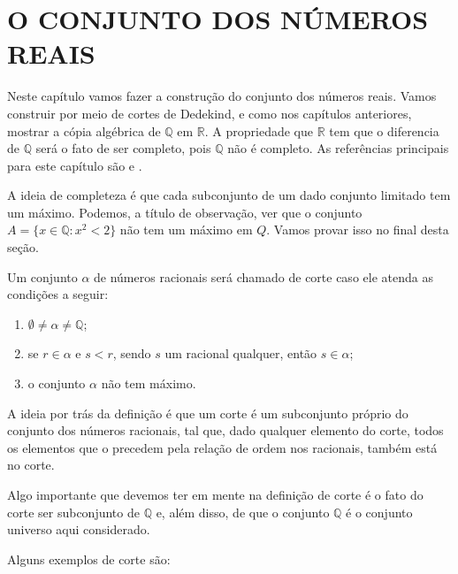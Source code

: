 \documentclass[../main.tex]{subfiles}
\begin{document}
\chapter{O CONJUNTO DOS NÚMEROS REAIS}\label{cap-reais}

Neste capítulo vamos fazer a construção do conjunto dos números reais. Vamos construir por meio de cortes de Dedekind, e como nos capítulos anteriores, mostrar a cópia algébrica de $\mathbb{Q}$ em $\mathbb{R}$. A propriedade que $\mathbb{R}$ tem que o diferencia de $\mathbb{Q}$ será o fato de ser completo, pois $\mathbb{Q}$ não é completo. As referências principais para este capítulo são \textcite{ferreira} e \textcite{domingues-2009}.

A ideia de completeza é que cada subconjunto de um dado conjunto limitado tem um máximo. Podemos, a título de observação, ver que o conjunto 
$A = \{ x \in \mathbb{Q} : x^2 < 2\}$ não tem um máximo em $Q$. Vamos provar isso no final desta seção.

\begin{defi}\label{reais-def-corte}
    Um conjunto $\alpha$ de números racionais será chamado de corte caso ele atenda as condições a seguir:
    \begin{enumerate}[label=(\roman*)]
        \item\label{reais-def-corteSubconjuntoProprio} $\emptyset \neq \alpha \neq \mathbb{Q}$;
        \item\label{reais-def-cortePrecede} se $r \in \alpha$ e $s < r$, sendo $s$ um racional qualquer, então $s \in \alpha$;
        \item\label{reais-def-corteSemMaximo} o conjunto $\alpha$ não tem máximo.
    \end{enumerate}
\end{defi}

A ideia por trás da definição é que um corte é um subconjunto próprio do conjunto dos números racionais, tal que, dado qualquer elemento do corte, todos os elementos que o precedem pela relação de ordem nos racionais, também está no corte.

\begin{obs}
    Algo importante que devemos ter em mente na definição de corte é o fato do corte ser subconjunto de $\mathbb{Q}$ e, além disso, de que o conjunto $\mathbb{Q}$ é o conjunto universo aqui considerado.
\end{obs}

Alguns exemplos de corte são:
\end{document}
